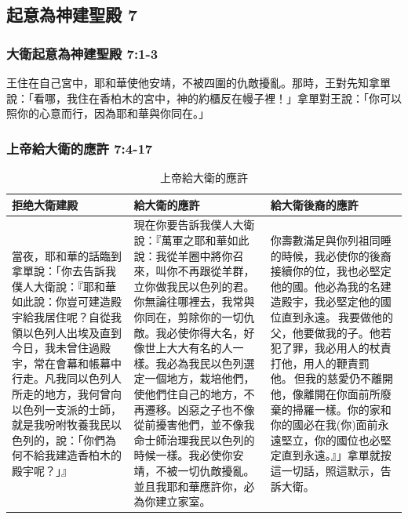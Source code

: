 \subsection{起意為神建聖殿 7}
\subsubsection{大衛起意為神建聖殿 7:1-3}
王住在自己宮中，耶和華使他安靖，不被四圍的仇敵擾亂。那時，王對先知拿單說：「看哪，我住在香柏木的宮中，神的約櫃反在幔子裡！」拿單對王說：「你可以照你的心意而行，因為耶和華與你同在。」

\subsubsection{上帝給大衛的應許 7:4-17}
\begin{table}[H]
\centering 
\begin{tabular}{p{4.75cm}|p{6.5cm}|p{5.8cm}}\hline\hline
拒绝大衛建殿&給大衛的應許&給大衛後裔的應許 \\\hline
當夜，耶和華的話臨到拿單說：「你去告訴我僕人大衛說：『耶和華如此說：你豈可建造殿宇給我居住呢？自從我領以色列人出埃及直到今日，我未曾住過殿宇，常在會幕和帳幕中行走。凡我同以色列人所走的地方，我何曾向以色列一支派的士師，就是我吩咐牧養我民以色列的，說：「你們為何不給我建造香柏木的殿宇呢？」』 
&現在你要告訴我僕人大衛說：『萬軍之耶和華如此說：我從羊圈中將你召來，叫你不再跟從羊群，立你做我民以色列的君。你無論往哪裡去，我常與你同在，剪除你的一切仇敵。我必使你得大名，好像世上大大有名的人一樣。我必為我民以色列選定一個地方，栽培他們，使他們住自己的地方，不再遷移。凶惡之子也不像從前擾害他們，並不像我命士師治理我民以色列的時候一樣。我必使你安靖，不被一切仇敵擾亂。並且我耶和華應許你，必為你建立家室。
&你壽數滿足與你列祖同睡的時候，我必使你的後裔接續你的位，我也必堅定他的國。他必為我的名建造殿宇，我必堅定他的國位直到永遠。 我要做他的父，他要做我的子。他若犯了罪，我必用人的杖責打他，用人的鞭責罰他。 但我的慈愛仍不離開他，像離開在你面前所廢棄的掃羅一樣。你的家和你的國必在我(你)面前永遠堅立，你的國位也必堅定直到永遠。』」拿單就按這一切話，照這默示，告訴大衛。\\\hline
\end{tabular}
\caption{上帝給大衛的應許}
\end{table}



